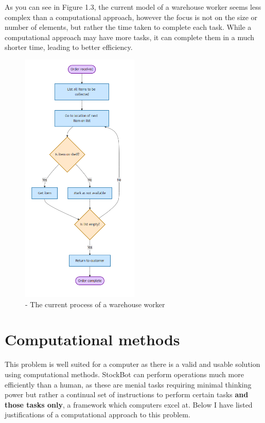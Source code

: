 \newpage

As you can see in Figure 1.3, the current model of a warehouse worker seems less complex than a computational approach, however the focus is not on the size or number of elements, but rather the time taken to complete each task. While a computational approach may have more tasks, it can complete them in a much shorter time, leading to better efficiency.

\begin{figure}[h] 
\centering    
\includegraphics[width=0.5\textwidth]{CurrentSysModel.png}
\caption{- The current process of a warehouse worker}
\label{The current process of a warehouse worker}
\end{figure}

\newpage

\section{Computational methods}

This problem is well suited for a computer as there is a valid and usable solution using computational methods. StockBot can perform operations much more efficiently than a human, as these are menial tasks requiring minimal thinking power but rather a continual set of instructions to perform certain tasks \textbf{and those tasks only}, a framework which computers excel at. Below I have listed justifications of a computational approach to this problem.

